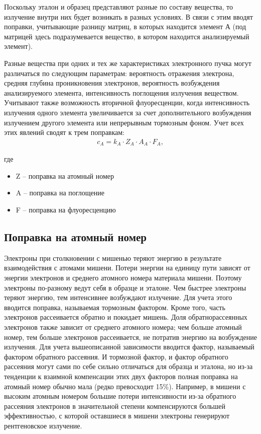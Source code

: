 \documentclass[14pt]{extarticle}
\newcommand{\vlevo}{\hspace*{-0.62cm}}
\begin{document}
Поскольку эталон и образец представляют разные по составу вещества, то излучение внутри них будет возникать в разных условиях. В связи с этим вводят поправки, учитывающие разницу матриц, в которых находится элемент А (под матрицей здесь подразумевается вещество, в котором находится анализируемый элемент). \par
Разные вещества при одних и тех же характеристиках электронного пучка могут различаться по следующим параметрам: вероятность отражения электрона, средняя глубина проникновения электронов, вероятность возбуждения анализируемого элемента, интенсивность поглощения излучения веществом. Учитывают также возможность вторичной флуоресценции, когда интенсивность излучения одного элемента увеличивается за счет дополнительного возбуждения излучением другого элемента или непрерывным тормозным фоном. Учет всех этих явлений сводят к трем поправкам:
\begin{gather}
		c_A = k_A \cdot Z_A \cdot A_A \cdot F_A, \label{equation}
\end{gather}

\vlevo где 
\begin{itemize}
	\item Z -- поправка на атомный номер
	\item A -- поправка на поглощение
	\item F -- поправка на флуоресценцию
\end{itemize}

\subsection*{Поправка на атомный номер}
Электроны при столкновении с мишенью теряют энергию в результате взаимодействия с атомами мишени. Потери энергии на единицу пути зависят от энергии электронов и среднего атомного номера материала мишени. Поэтому электроны по-разному ведут себя в образце и эталоне. Чем быстрее электроны теряют энергию, тем интенсивнее возбуждают излучение. Для учета этого вводится поправка, называемая тормозным фактором. Кроме того, часть электронов рассеивается обратно и покидает мишень. Доля обратнорассеянных электронов также зависит от среднего атомного номера; чем больше атомный номер, тем больше электронов рассеивается, не потратив энергию на возбуждение излучения. Для учета вышеописанной зависимости вводится фактор, называемый фактором обратного рассеяния. И тормозной фактор, и фактор обратного рассеяния могут сами по себе сильно отличаться для образца и эталона, но из-за тенденции к взаимной компенсации этих двух факторов полная поправка на атомный номер обычно мала (редко превосходит 15\%). Например, в мишени с высоким атомным номером большие потери интенсивности из-за обратного рассеяния электронов в значительной степени компенсируются большей эффективностью, с которой оставшиеся в мишени электроны генерируют рентгеновское излучение. 
\end{document}
